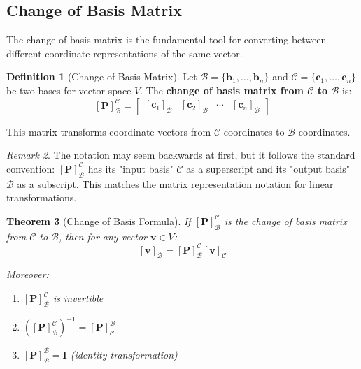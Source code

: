 \documentclass[12pt]{article}
\numberwithin{equation}{section}
\newcommand{\vect}[1]{\boldsymbol{#1}}   %
\newcommand{\mat}[1]{\mathbf{#1}}        %
\theoremstyle{plain}
\newtheorem{theorem}{Theorem}[section]
\theoremstyle{definition}
\newtheorem{definition}[theorem]{Definition}
\theoremstyle{remark}
\newtheorem{remark}[theorem]{Remark}
\begin{document}
\subsection{Change of Basis Matrix}

The change of basis matrix is the fundamental tool for converting between different coordinate representations of the same vector.

\begin{definition}[Change of Basis Matrix]
Let $\mathcal{B} = \{\vect{b}_1, \ldots, \vect{b}_n\}$ and $\mathcal{C} = \{\vect{c}_1, \ldots, \vect{c}_n\}$ be two bases for vector space $V$. The \textbf{change of basis matrix from $\mathcal{C}$ to $\mathcal{B}$} is:
$$[\mat{P}]_{\mathcal{B}}^{\mathcal{C}} = \begin{bmatrix} [\vect{c}_1]_{\mathcal{B}} & [\vect{c}_2]_{\mathcal{B}} & \cdots & [\vect{c}_n]_{\mathcal{B}} \end{bmatrix}$$

This matrix transforms coordinate vectors from $\mathcal{C}$-coordinates to $\mathcal{B}$-coordinates.
\end{definition}

\begin{remark}
The notation may seem backwards at first, but it follows the standard convention: $[\mat{P}]_{\mathcal{B}}^{\mathcal{C}}$ has its "input basis" $\mathcal{C}$ as a superscript and its "output basis" $\mathcal{B}$ as a subscript. This matches the matrix representation notation for linear transformations.
\end{remark}

\begin{theorem}[Change of Basis Formula]
If $[\mat{P}]_{\mathcal{B}}^{\mathcal{C}}$ is the change of basis matrix from $\mathcal{C}$ to $\mathcal{B}$, then for any vector $\vect{v} \in V$:
$$[\vect{v}]_{\mathcal{B}} = [\mat{P}]_{\mathcal{B}}^{\mathcal{C}} [\vect{v}]_{\mathcal{C}}$$

Moreover:
\begin{enumerate}
\item $[\mat{P}]_{\mathcal{B}}^{\mathcal{C}}$ is invertible
\item $([\mat{P}]_{\mathcal{B}}^{\mathcal{C}})^{-1} = [\mat{P}]_{\mathcal{C}}^{\mathcal{B}}$
\item $[\mat{P}]_{\mathcal{B}}^{\mathcal{B}} = \mat{I}$ (identity transformation)
\end{enumerate}
\end{theorem}
\end{document}
